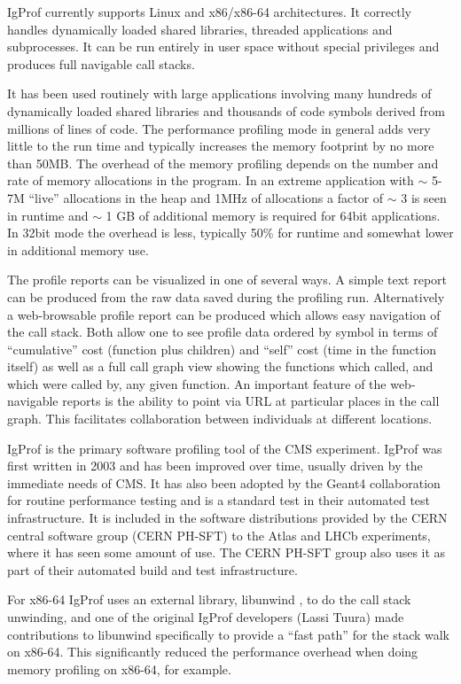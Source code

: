 \documentclass[notitlepage,letter,12pt]{article}
\begin{document}
IgProf currently supports Linux and x86/x86-64 architectures. It correctly 
handles dynamically loaded shared libraries, threaded applications
and subprocesses. It can be run entirely in user space without special 
privileges and produces full navigable call stacks.

It has been used routinely with large applications involving many hundreds
of dynamically loaded shared libraries and thousands of code symbols
derived from millions of lines of code. The performance profiling mode in 
general adds very little to the run time and typically increases the memory 
footprint by no more than 50MB. The overhead of the memory profiling depends 
on the number and rate of memory allocations in the program. In an extreme 
application with $\sim$ 5-7M ``live'' allocations in the heap and 1MHz of 
allocations
a factor of $\sim$ 3 is seen in runtime and $\sim$ 1 GB of additional
memory is required for 64bit applications. In 32bit mode the overhead
is less, typically 50\% for runtime and somewhat lower in additional 
memory use.

The profile reports can be visualized in one of several ways. A simple text
report can be produced from the raw data saved during the profiling run.
Alternatively a web-browsable profile report can be produced which allows
easy navigation of the call stack. Both allow one to see profile data 
ordered by symbol in terms of ``cumulative'' cost (function plus children)
and ``self'' cost (time in the function itself) as well as a
full call graph view showing the functions which called, and which were
called by, any given function. An important feature of the web-navigable
reports is the ability to point via URL at particular places in the
call graph. This facilitates collaboration between individuals at
different locations.

IgProf is the primary software profiling tool of the CMS experiment. 
IgProf was first written in 2003 and has been improved over time,
usually driven by the immediate needs of CMS. It has also been adopted by
the Geant4 \cite{GEANT4} collaboration for routine performance testing and
is a standard test in their automated test infrastructure. It is included in 
the software distributions provided by the CERN central software group 
(CERN PH-SFT) to the Atlas and LHCb experiments, where it has seen some 
amount of use. The CERN PH-SFT group also uses it as part of their
automated build and test infrastructure.

For x86-64 IgProf uses an external library, libunwind \cite{LIBUNWIND}, to
do the call stack unwinding, and one of the original IgProf developers
(Lassi Tuura) made contributions to libunwind specifically to provide
a ``fast path'' for the stack walk on x86-64. This significantly reduced
the performance overhead when doing memory profiling on x86-64, for example.
\end{document}
